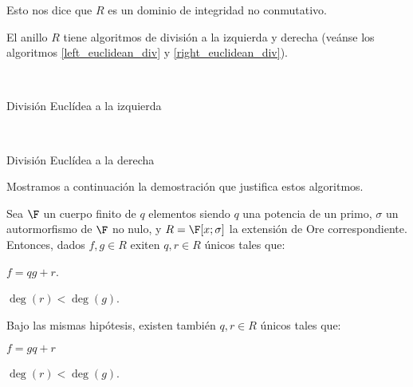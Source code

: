 Esto nos dice que \(R\) es un dominio de integridad no conmutativo.

El anillo \(R\) tiene algoritmos de división a la izquierda y derecha (veánse los algoritmos \ref{left_euclidean_div} y \ref{right_euclidean_div}).

\begin{algorithm}[H]
 \label{left_euclidean_div}
  \\
 \caption{División Euclídea a la izquierda}
\end{algorithm}

\begin{algorithm}[H]
 \label{right_euclidean_div}
  \\
 \caption{División Euclídea a la derecha}
\end{algorithm}

Mostramos a continuación la demostración que justifica estos algoritmos.

\begin{theorem}
Sea \(\F\) un cuerpo finito de \(q\) elementos siendo \(q\) una potencia de un primo,  \(\sigma\) un autormorfismo de \(\F\) no nulo, y \(R = \F[x;\sigma]\) la extensión de Ore correspondiente. Entonces, dados \(f, g \in R\) exiten \(q, r \in R\) únicos tales que:
\begin{nlist}
    \item \(f = qg + r\).
    \item \(\deg(r) < \deg(g)\).
\end{nlist}

Bajo las mismas hipótesis, existen también \(q, r \in R\) únicos tales que:
\begin{nlist}
    \item \(f = gq + r\)
    \item \(\deg(r) < \deg(g)\).
\end{nlist}
\end{theorem}

